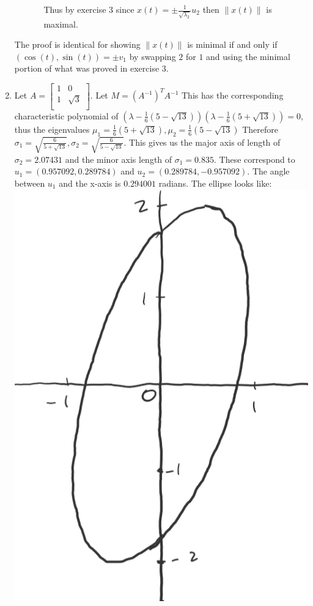 \documentclass[12pt, letterpaper]{article}
\begin{document}
\begin{enumerate}
\begin{itemize}
\begin{itemize}
				Thus by exercise 3 since $x(t) = \pm \frac{1}{\sqrt{\lambda_2}} u_2$ then $\|x(t)\|$ is maximal.  
			\end{itemize}
		\end{itemize}
		The proof is identical for showing $\|x(t)\|$ is minimal if and only if $(\cos(t), \sin(t)) = \pm v_1$ by swapping $2$ for $1$ and using the minimal portion of what was proved in exercise 3.
		\item Let $A = \begin{bmatrix}
 1 & 0 \\
 1 & \sqrt{3} \\
\end{bmatrix}		 $. Let $M = (A^{-1})^T A^{-1}$ This has the corresponding characteristic polynomial of $(\lambda - \frac{1}{6} (5-\sqrt{13}))(\lambda - \frac{1}{6} (5+\sqrt{13})) = 0$, thus the eigenvalues $\mu_1 = \frac{1}{6} (5+\sqrt{13}), \mu_2 = \frac{1}{6} (5-\sqrt{13})$  Therefore $\sigma_1 = \sqrt{\frac{6}{5+\sqrt{13}}}, \sigma_2 = \sqrt{\frac{6}{5-\sqrt{13}}}$.  This gives us the major axis of length of $\sigma_2 = 2.07431$ and the minor axis length of $\sigma_1 = 0.835$.  These correspond to $u_1 = (0.957092, 0.289784)$ and $u_2 = (0.289784, -0.957092)$.  The angle between $u_1$ and the x-axis is $0.294001$ radians.
	The ellipse looks like: 
	\includegraphics[scale=1.0]{challangeProblemSet1-292-ellipse.png}  

\end{enumerate}
\end{document}
